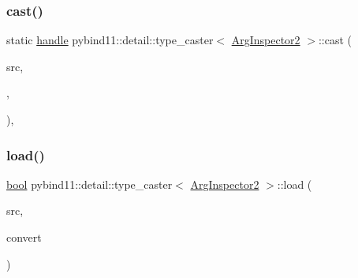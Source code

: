 \subsubsection{\texorpdfstring{cast()}{cast()}}
{\footnotesize\ttfamily static \mbox{\hyperlink{classhandle}{handle}} pybind11\+::detail\+::type\+\_\+caster$<$ \mbox{\hyperlink{class_arg_inspector2}{Arg\+Inspector2}} $>$\+::cast (\begin{DoxyParamCaption}\item[{const \mbox{\hyperlink{class_arg_inspector2}{Arg\+Inspector2}} \&}]{src,  }\item[{\mbox{\hyperlink{detail_2common_8h_adde72ab1fb0dd4b48a5232c349a53841}{return\+\_\+value\+\_\+policy}}}]{,  }\item[{\mbox{\hyperlink{classhandle}{handle}}}]{ }\end{DoxyParamCaption})\hspace{0.3cm}{\ttfamily [inline]}, {\ttfamily [static]}}

\mbox{\label{structpybind11_1_1detail_1_1type__caster_3_01_arg_inspector2_01_4_aeb3a180d004e5c400fbc18571ce959c3}} 
\subsubsection{\texorpdfstring{load()}{load()}}
{\footnotesize\ttfamily \mbox{\hyperlink{asdl_8h_af6a258d8f3ee5206d682d799316314b1}{bool}} pybind11\+::detail\+::type\+\_\+caster$<$ \mbox{\hyperlink{class_arg_inspector2}{Arg\+Inspector2}} $>$\+::load (\begin{DoxyParamCaption}\item[{\mbox{\hyperlink{classhandle}{handle}}}]{src,  }\item[{\mbox{\hyperlink{asdl_8h_af6a258d8f3ee5206d682d799316314b1}{bool}}}]{convert }\end{DoxyParamCaption})\hspace{0.3cm}{\ttfamily [inline]}}

\mbox{\label{structpybind11_1_1detail_1_1type__caster_3_01_arg_inspector2_01_4_a53acb0b05e481dd100705fe17ff77cbd}} 
